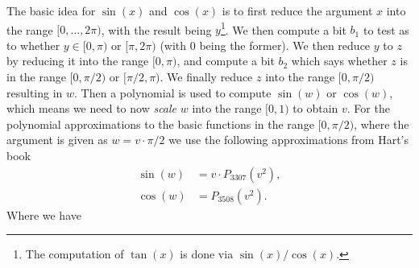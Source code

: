 
The basic idea for $\sin(x)$ and $\cos(x)$ is to first reduce
the argument $x$ into the range $[0,\ldots,2 \pi)$,
with the result being $y$\footnote{The computation
of $\tan(x)$ is done via $\sin(x)/\cos(x)$.}.
We then compute a bit $b_1$ to test as to whether
$y \in [0,\pi)$ or $[\pi,2 \pi)$ (with $0$ being
the former).
We then reduce $y$ to $z$ by reducing it into the range
$[0,\pi)$, and compute a bit $b_2$ which says whether
$z$ is in the range $[0,\pi/2)$ or $[\pi/2,\pi)$.
We finally reduce $z$ into the range $[0,\pi/2)$ resulting 
in $w$.
Then a polynomial is used to compute
$\sin(w)$ or $\cos(w)$, which means
we need to now {\em scale} $w$ into the range $[0,1)$
to obtain $v$.
For the polynomial approximations to the basic functions in
the range $[0,\pi/2)$, where the argument is given as $w = v \cdot \pi/2$
we use the following approximations from Hart's book \cite{Hart:1978:CA:540084}
\begin{align*} 
	\sin(w) &= v \cdot P_{3307}(v^2), \\
	\cos(w) &= P_{3508}(v^2).
\end{align*}
Where we have
